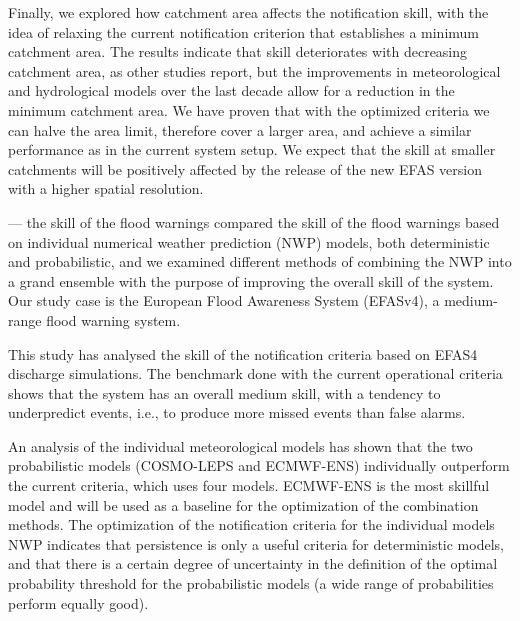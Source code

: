 \documentclass[preprint,12pt,authoryear]{elsarticle}
\begin{document}
Finally, we explored how catchment area affects the notification skill, with the idea of relaxing the current notification criterion that establishes a minimum catchment area. The results indicate that skill deteriorates with decreasing catchment area, as other studies report, but the improvements in meteorological and hydrological models over the last decade allow for a reduction in the minimum catchment area. We have proven that with the optimized criteria we can halve the area limit, therefore cover a larger area, and achieve a similar performance as in the current system setup. We expect that the skill at smaller catchments will be positively affected by the release of the new EFAS version with a higher spatial resolution.


--- 
the skill of the flood warnings compared the skill of the flood warnings based on individual numerical weather prediction (NWP) models, both deterministic and probabilistic, and we examined different methods of combining the NWP into a grand ensemble with the purpose of improving the overall skill of the system. Our study case is the European Flood Awareness System (EFASv4), a medium-range flood warning system.

This study has analysed the skill of the notification criteria based on EFAS4 discharge simulations. The benchmark done with the current operational criteria shows that the system has an overall medium skill, with a tendency to underpredict events, i.e., to produce more missed events than false alarms.

An analysis of the individual meteorological models has shown that the two probabilistic models (COSMO-LEPS and ECMWF-ENS) individually outperform the current criteria, which uses four models. ECMWF-ENS is the most skillful model and will be used as a baseline for the optimization of the combination methods. The optimization of the notification criteria for the individual models NWP indicates that persistence is only a useful criteria for deterministic models, and that there is a certain degree of uncertainty in the definition of the optimal probability threshold for the probabilistic models (a wide range of probabilities perform equally good).
\end{document}
